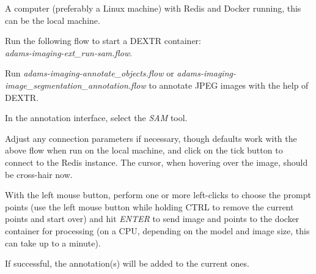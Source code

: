 \documentclass[a4paper]{book}
\begin{document}
\begin{tight_itemize}
  \item A computer (preferably a Linux machine) with Redis\cite{redis} and Docker\cite{docker} running,
  this can be the local machine.
  \item Run the following flow to start a DEXTR container: \\
  \textit{adams-imaging-ext\_run-sam.flow}.
  \item Run \textit{adams-imaging-annotate\_objects.flow} or \textit{adams-imaging-image_segmentation_annotation.flow}
  to annotate JPEG images with the help of DEXTR.
  \begin{tight_itemize}
    \item In the annotation interface, select the \textit{SAM} tool.
    \item Adjust any connection parameters if necessary, though defaults work with the above flow when run on the
    local machine, and click on the tick button to connect to the Redis instance. The cursor, when hovering over
    the image, should be cross-hair now.
    \item With the left mouse button, perform one or more left-clicks to choose the prompt points (use the left mouse
    button while holding CTRL to remove the current points and start over) and hit \textit{ENTER} to send image and
    points to the docker container for processing (on a CPU, depending on the model and image size, this can take up to a minute).
    \item If successful, the annotation(s) will be added to the current ones.
  \end{tight_itemize}
\end{tight_itemize}



\end{document}
